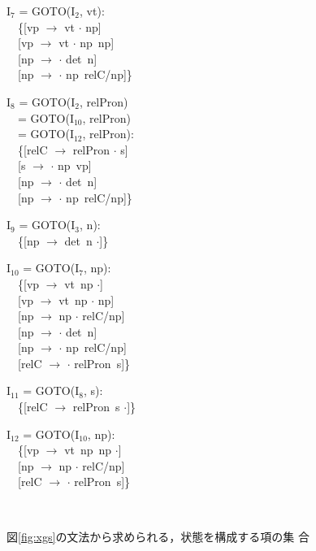 \begin{figure}[htbp]
\begin{center}
{\begin{minipage}[t]{\mpw}
        \vspace{\vs}
        I$_{7}$ = GOTO(I$_{2}$, vt): \\
        　\{[vp $\to$ vt $\cdot$ np] \\ 
        　[vp $\to$ vt $\cdot$ np\ np] \\ 
        　[np $\to$ $\cdot$ det\ n] \\
        　[np $\to$ $\cdot$ np\ relC/np]\}
        
        \vspace{\vs}
        I$_{8}$ = GOTO(I$_{2}$, relPron) \\ 
        　= GOTO(I$_{10}$, relPron) \\
        　= GOTO(I$_{12}$, relPron): \\
        　\{[relC $\to$ relPron $\cdot$ s] \\ 
        　[s $\to$ $\cdot$ np\ vp] \\ 
        　[np $\to$ $\cdot$ det\ n] \\
        　[np $\to$ $\cdot$ np\ relC/np]\} 
      \end{minipage}
      \begin{minipage}[t]{\mpw}
        I$_{9}$ = GOTO(I$_{3}$, n): \\
        　\{[np $\to$ det\ n $\cdot$]\}

        \vspace{\vs}
        I$_{10}$ = GOTO(I$_{7}$, np): \\
        　\{[vp $\to$ vt\ np $\cdot$] \\
        　[vp $\to$ vt\ np $\cdot$ np] \\
        　[np $\to$ np $\cdot$ relC/np] \\
        　[np $\to$ $\cdot$ det\ n] \\
        　[np $\to$ $\cdot$ np\ relC/np] \\
        　[relC $\to$ $\cdot$ relPron\ s]\}

        \vspace{\vs}
        I$_{11}$ = GOTO(I$_{8}$, s): \\
        　\{[relC $\to$ relPron\ s $\cdot$]\}

        \vspace{\vs}
        I$_{12}$ = GOTO(I$_{10}$, np): \\
        　\{[vp $\to$ vt\ np\ np $\cdot$] \\
        　[np $\to$ np $\cdot$ relC/np] \\
        　[relC $\to$ $\cdot$ relPron\ s]\}
      \end{minipage} \\
    }
    \caption{図\ref{fig:xgs}の文法から求められる，状態を構成する項の集
      合}
    \label{fig:states2}
  \end{center}
\end{figure}

